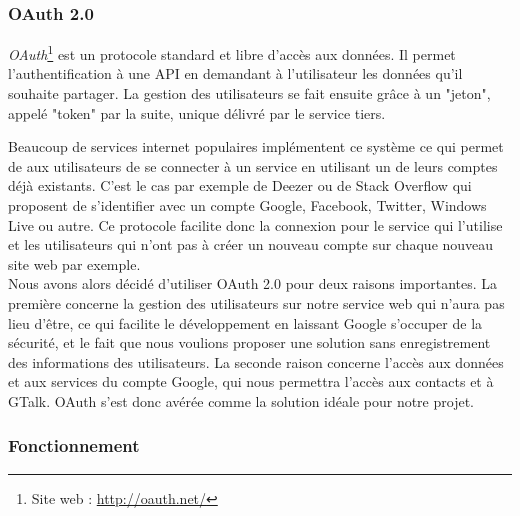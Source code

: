 
\subsubsection{OAuth 2.0}

\textit{OAuth}\footnote{Site web : \href{http://oauth.net/}{http://oauth.net/}} est un protocole standard et libre d'accès aux données.
Il permet l'authentification à une API en demandant à l'utilisateur les données qu'il souhaite partager.
La gestion des utilisateurs se fait ensuite grâce à un "jeton", appelé "token" par la suite, unique délivré par le service tiers.

Beaucoup de services internet populaires implémentent ce système ce qui permet de aux utilisateurs de se connecter à un service en utilisant un de leurs comptes déjà existants.
C'est le cas par exemple de Deezer ou de Stack Overflow qui proposent de s'identifier avec un compte Google, Facebook, Twitter, Windows Live ou autre.
Ce protocole facilite donc la connexion pour le service qui l'utilise et les utilisateurs qui n'ont pas 
à créer un nouveau compte sur chaque nouveau site web par exemple.
\\


Nous avons alors décidé d'utiliser OAuth 2.0 pour deux raisons importantes.
La première concerne la gestion des utilisateurs sur notre service web qui n'aura pas lieu d'être, ce qui facilite le développement en laissant Google s'occuper de la sécurité, et le fait que nous voulions proposer une solution sans enregistrement des informations des utilisateurs.
La seconde raison concerne l'accès aux données et aux services du compte Google, qui nous permettra l'accès aux contacts et à GTalk.
OAuth s'est donc avérée comme la solution idéale pour notre projet.


\subsubsection{Fonctionnement}

